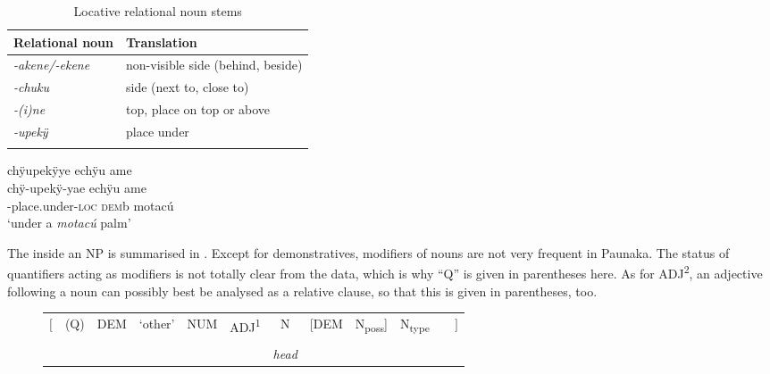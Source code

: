 \begin{table}[htbp]
\caption{Locative relational noun stems}

\begin{tabular}{ll}
\lsptoprule
Relational noun & Translation \\
\midrule
\textit{-akene/-ekene} & non-visible side (behind, beside)\\
\textit{-chuku} & side (next to, close to)\\
\textit{-(i)ne} & top, place on top or above\\
\textit{-upekÿ} & place under\\
\lspbottomrule
\end{tabular}

\label{table:Sketch-noun-stems-locative}
\end{table}

\ea\label{ex:Sketch-under}
\begingl
\glpreamble chÿupekÿye echÿu ame\\
\gla chÿ-upekÿ-yae echÿu ame\\
-place.under-\textsc{loc} \textsc{dem}b motacú\\
\glft ‘under a \textit{motacú} palm’\\
\endgl
\xe
{}

The  inside an NP is summarised in . Except for demonstratives, modifiers of nouns are not very frequent in Paunaka. The status of quantifiers acting as modifiers is not totally clear from the data, which is why “Q” is given in parentheses here. As for ADJ\textsuperscript{2}, an adjective following a noun can possibly best be analysed as a relative clause, so that this is given in parentheses, too.


\begin{figure}
\begin{tabularx}{\textwidth}{rQCCCCCCCCQl}
{${\Biggl [}$} & {(Q)} & {DEM} & {‘other’} & {NUM} & {ADJ\textsuperscript{1}} & {N} & [{DEM}  & {N\textsubscript{poss}}] & {N\textsubscript{type}} & {} & {${\Biggl ]}$}\\
 & & &  & & & & & & &  &\\
& & & & & & \textit{head} & & & & & \\
\end{tabularx}
\label{fig:Sketch-NP}
\end{figure}

